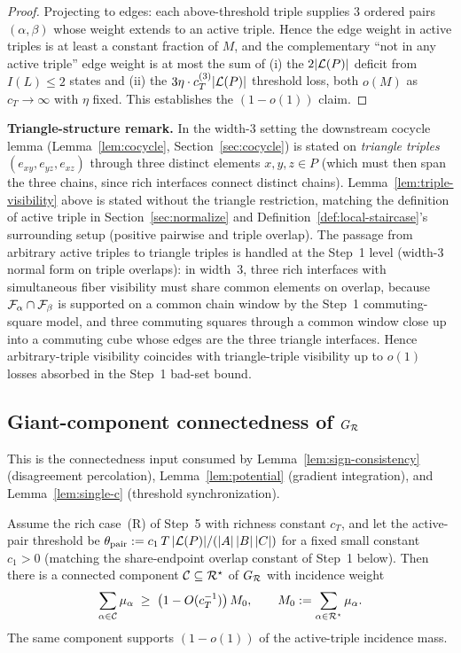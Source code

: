 \begin{proof}
Projecting to edges: each above-threshold triple supplies
$3$ ordered pairs $(\alpha,\beta)$ whose weight extends to an active
triple.  Hence the edge weight in active triples is at least a
constant fraction of $M$, and the complementary ``not in any active
triple'' edge weight is at most the sum of (i) the $2|\mathcal{L}(P)|$
deficit from $I(L)\le 2$ states and (ii) the $3\eta\cdot
c_T^{(3)}|\mathcal{L}(P)|$ threshold loss, both $o(M)$ as $c_T\to\infty$ with
$\eta$ fixed.  This establishes the $(1-o(1))$ claim.
\end{proof}

\textbf{Triangle-structure remark.}  In the width-3 setting the
downstream cocycle lemma (Lemma~\ref{lem:cocycle},
Section~\ref{sec:cocycle}) is stated on \emph{triangle triples}
$(e_{xy},e_{yz},e_{xz})$ through three distinct elements
$x,y,z\in P$ (which must then span the three chains, since rich
interfaces connect distinct chains).  Lemma~\ref{lem:triple-visibility}
above is stated without the triangle restriction, matching the
definition of active triple in Section~\ref{sec:normalize} and
Definition~\ref{def:local-staircase}'s surrounding setup (positive
pairwise and triple overlap).  The passage from arbitrary active
triples to triangle triples is handled at the Step~1 level (width-3
normal form on triple overlaps): in width~$3$, three rich interfaces
with
simultaneous fiber visibility must share common elements on
overlap, because $\mathcal{F}_{\alpha}\cap\mathcal{F}_{\beta}$ is supported on a
common chain window by the Step~1 commuting-square model, and three
commuting squares through a common window close up into a
commuting cube whose edges are the three triangle interfaces.
Hence arbitrary-triple visibility coincides with
triangle-triple visibility up to $o(1)$ losses absorbed in the
Step~1 bad-set bound.

\subsection{Giant-component connectedness of $G_{\mathcal{R}}$}\label{sec:gap-connected}

This is the connectedness input consumed by
Lemma~\ref{lem:sign-consistency} (disagreement percolation),
Lemma~\ref{lem:potential} (gradient integration), and
Lemma~\ref{lem:single-c} (threshold synchronization).

\begin{lemma}\label{lem:giant-component}
Assume the rich case~(R) of Step~5 with richness constant $c_T$, and
let the active-pair threshold be
$\theta_{\rm pair}:=c_1\,T\,|\mathcal{L}(P)|/(|A|\,|B|\,|C|)$ for a fixed
small constant $c_1>0$ (matching the share-endpoint overlap
constant of Step~1 below).  Then there is a connected component
$\mathcal{C}\subseteq\mathcal{R}^\star$ of $G_{\mathcal{R}}$ with incidence weight
\[
  \sum_{\alpha\in\mathcal{C}}\mu_\alpha
  \;\ge\; \bigl(1-O(c_T^{-1})\bigr)\,M_0,
  \qquad M_0:=\sum_{\alpha\in\mathcal{R}^\star}\mu_\alpha.
\]
The same component supports $(1-o(1))$ of the active-triple incidence
mass.
\end{lemma}

